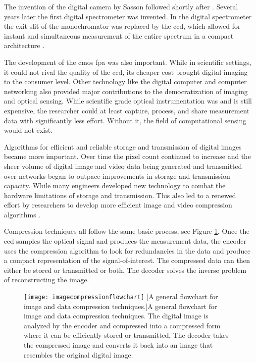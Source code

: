 The invention of the digital camera by Sasson followed shortly after \cite{kodaksfirstdigital2015}. Several years later the first digital spectrometer was invented. In the digital spectrometer the exit slit of the monochromator was replaced by the \gls{ccd}, which allowed for instant and simultaneous measurement of the entire spectrum in a compact architecture \cite{moore1979spectrometer}. 

The development of the \gls{cmos} \gls{fpa} was also important. While in scientific settings, it could not rival the quality of the \gls{ccd}, its cheaper cost brought digital imaging to the consumer level. Other technology like the digital computer and computer networking also provided major contributions to the democratization of imaging and optical sensing. While scientific grade optical instrumentation was and is still expensive, the researcher could at least capture, process, and share measurement data with significantly less effort. Without it, the field of computational sensing would not exist.

Algorithms for efficient and reliable storage and transmission of digital images became more important. Over time the pixel count continued to increase and the sheer volume of digital image and video data being generated and transmitted over networks began to outpace improvements in storage and transmission capacity. While many engineers developed new technology to combat the hardware limitations of storage and transmission. This also led to a renewed effort by researchers to develop more efficient image and video compression algorithms \cite{kobayashi1974image, ziv1978compression}. 

Compression techniques all follow the same basic process, see Figure \ref{fig:imagecompressionflowchart}. Once the \gls{ccd} samples the optical signal and produces the measurement data, the encoder uses the compression algorithm to look for redundancies in the data and produce a compact representation of the signal-of-interest. The compressed data can then either be stored or transmitted or both. The decoder solves the inverse problem of reconstructing the image. 

\begin{figure}
    \centering
    \texttt{[image: imagecompressionflowchart]}
    [A general flowchart for image and data compression techniques.]{A general flowchart for image and data compression techniques. The digital image is analyzed by the encoder and compressed into a compressed form where it can be efficiently stored or transmitted. The decoder takes the compressed image and converts it back into an image that resembles the original digital image. }
    \label{fig:imagecompressionflowchart}
\end{figure}

